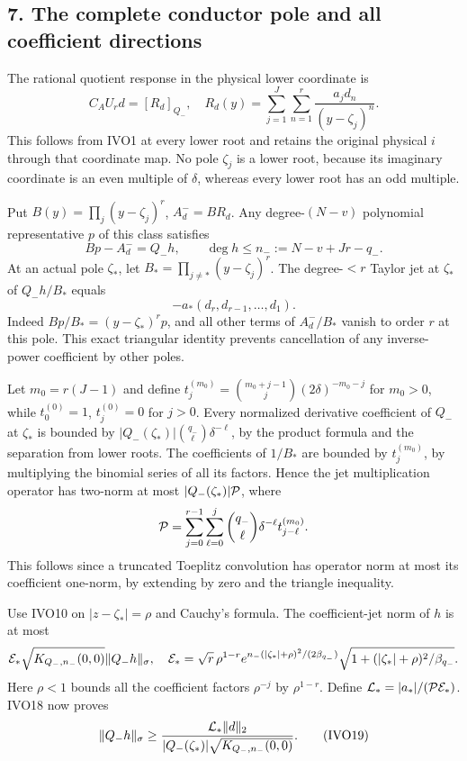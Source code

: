 \documentclass[11pt]{article}
\begin{document}
\subsection{7. The complete conductor pole and all coefficient directions}\label{the-complete-conductor-pole-and-all-coefficient-directions}

The rational quotient response in the physical lower coordinate is \[
C_AU_rd=[R_d]_{Q_-},\quad
R_d(y)=\sum_{j=1}^J\sum_{n=1}^r\frac{a_jd_n}{(y-\zeta_j)^n}.
\tag{IVO16}
\] This follows from IVO1 at every lower root and retains the original physical \(i\) through that coordinate map. No pole \(\zeta_j\) is a lower root, because its imaginary coordinate is an even multiple of \(\delta\), whereas every lower root has an odd multiple.

Put \(B(y)=\prod_j(y-\zeta_j)^r\), \(A_d^-=BR_d\). Any degree-\((N-v)\) polynomial representative \(p\) of this class satisfies \[
Bp-A_d^-=Q_-h,\qquad
\deg h\le n_-:=N-v+Jr-q_-.
\tag{IVO17}
\] At an actual pole \(\zeta_*\), let \(B_*=\prod_{j\ne*}(y-\zeta_j)^r\). The degree-\(<r\) Taylor jet at \(\zeta_*\) of \(Q_-h/B_*\) equals \[
-a_*(d_r,d_{r-1},\ldots,d_1).
\tag{IVO18}
\] Indeed \(Bp/B_*=(y-\zeta_*)^rp\), and all other terms of \(A_d^-/B_*\) vanish to order \(r\) at this pole. This exact triangular identity prevents cancellation of any inverse-power coefficient by other poles.

Let \(m_0=r(J-1)\) and define \(t_j^{(m_0)}=\binom{m_0+j-1}{j}(2\delta)^{-m_0-j}\) for \(m_0>0\), while \(t_0^{(0)}=1\), \(t_j^{(0)}=0\) for \(j>0\). Every normalized derivative coefficient of \(Q_-\) at \(\zeta_*\) is bounded by \(|Q_-(\zeta_*)|\binom{q_-}{\ell}\delta^{-\ell}\), by the product formula and the separation from lower roots. The coefficients of \(1/B_*\) are bounded by \(t_j^{(m_0)}\), by multiplying the binomial series of all its factors. Hence the jet multiplication operator has two-norm at most \(|Q_-(\zeta_*)|{\cal P}\), where \[
{\cal P}=\sum_{j=0}^{r-1}\sum_{\ell=0}^j
\binom{q_-}{\ell}\delta^{-\ell}t_{j-\ell}^{(m_0)}.
\] This follows since a truncated Toeplitz convolution has operator norm at most its coefficient one-norm, by extending by zero and the triangle inequality.

Use IVO10 on \(|z-\zeta_*|=\rho\) and Cauchy's formula. The coefficient-jet norm of \(h\) is at most \[
{\cal E}_*\sqrt{K_{Q_-,n_-}(0,0)}\|Q_-h\|_\sigma,\quad
{\cal E}_*=\sqrt r\,\rho^{1-r}
e^{n_-(|\zeta_*|+\rho)^2/(2\beta_{q_-})}
\sqrt{1+(|\zeta_*|+\rho)^2/\beta_{q_-}}.
\] Here \(\rho<1\) bounds all the coefficient factors \(\rho^{-j}\) by \(\rho^{1-r}\). Define \({\cal L}_*=|a_*|/({\cal P}{\cal E}_*)\). IVO18 now proves \[
\|Q_-h\|_\sigma\ge
\frac{{\cal L}_*\|d\|_2}
{|Q_-(\zeta_*)|\sqrt{K_{Q_-,n_-}(0,0)}}.
\tag{IVO19}
\]
\end{document}
